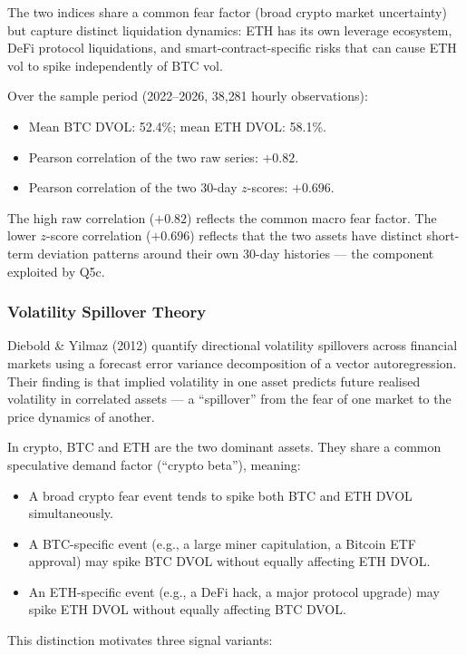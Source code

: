 \documentclass[12pt, a4paper]{article}
\theoremstyle{plain}
\theoremstyle{definition}
\begin{document}
The two indices share a common fear factor (broad crypto market
uncertainty) but capture distinct liquidation dynamics: ETH has its own
leverage ecosystem, DeFi protocol liquidations, and smart-contract-specific
risks that can cause ETH vol to spike independently of BTC vol.

Over the sample period (2022--2026, 38{,}281 hourly observations):
\begin{itemize}[noitemsep]
  \item Mean BTC DVOL: 52.4\%; mean ETH DVOL: 58.1\%.
  \item Pearson correlation of the two raw series: $+0.82$.
  \item Pearson correlation of the two 30-day $z$-scores: $+0.696$.
\end{itemize}

The high raw correlation ($+0.82$) reflects the common macro fear factor.
The lower $z$-score correlation ($+0.696$) reflects that the two assets
have distinct short-term deviation patterns around their own 30-day
histories --- the component exploited by Q5c.

\subsubsection{Volatility Spillover Theory}

Diebold \& Yilmaz (2012) quantify directional volatility spillovers
across financial markets using a forecast error variance decomposition
of a vector autoregression.  Their finding is that implied volatility
in one asset predicts future realised volatility in correlated assets
--- a ``spillover'' from the fear of one market to the price dynamics of
another.

In crypto, BTC and ETH are the two dominant assets.  They share a
common speculative demand factor (``crypto beta''), meaning:
\begin{itemize}[noitemsep]
  \item A broad crypto fear event tends to spike both BTC and ETH DVOL
        simultaneously.
  \item A BTC-specific event (e.g., a large miner capitulation, a
        Bitcoin ETF approval) may spike BTC DVOL without equally affecting
        ETH DVOL.
  \item An ETH-specific event (e.g., a DeFi hack, a major protocol
        upgrade) may spike ETH DVOL without equally affecting BTC DVOL.
\end{itemize}

This distinction motivates three signal variants:
\end{document}
